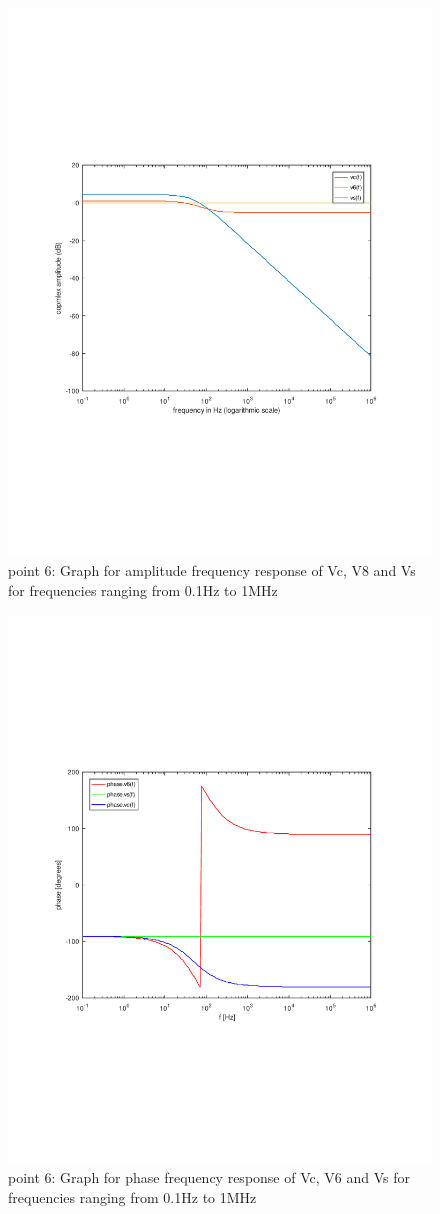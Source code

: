 \begin{figure}[h] \centering
\includegraphics[width=0.9\linewidth]{freq_resp_tab.pdf}
\caption{point 6: Graph for amplitude frequency response of Vc, V8 and Vs for frequencies ranging from 0.1Hz to 1MHz}
\label{fig:freq_resp}
\end{figure}

\begin{figure}[h] \centering
\includegraphics[width=0.9\linewidth]{angle_tab.pdf}
\caption{point 6: Graph for phase frequency response of Vc, V6 and Vs for frequencies ranging from 0.1Hz to 1MHz}
\label{fig:angle_resp}
\end{figure}





